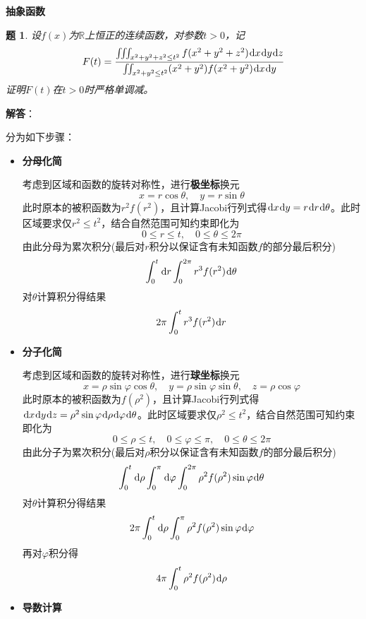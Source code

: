 \documentclass[a4paper,UTF8,fontset=windows,AutoFakeBold]{ctexart}
\newcommand*{\dr}{\hspace{0.07em}\mathrm{d}}
\newcommand*{\rb}{\mathbb{R}}
\theoremstyle{ex}
\newtheorem{exercise}{题}
\newcommand{\sol}[1]{{\vspace{5pt}\kaishu\noindent\textbf{解答}：\vspace{-3pt}
\begin{compactitem}
    \item[] #1
\end{compactitem}
}}
\begin{document}
\noindent\textbf{抽象函数}
\begin{framed}
\begin{exercise}
    设$f(x)$为$\rb$上恒正的连续函数，对参数$t>0$，记
    $$F(t)=\frac{\iiint_{x^2+y^2+z^2\le t^2}f(x^2+y^2+z^2)\dr x\dr y\dr z}{\iint_{x^2+y^2\le t^2}(x^2+y^2)f(x^2+y^2)\dr x\dr y}$$
    证明$F(t)$在$t>0$时严格单调减。
\end{exercise}
\sol{
    分为如下步骤：
    \begin{itemize}
        \item \textbf{分母化简}
        
        考虑到区域和函数的旋转对称性，进行\textbf{极坐标}换元
        $$x=r\cos\theta,\quad y=r\sin\theta$$
        此时原本的被积函数为$r^2f(r^2)$，且计算Jacobi行列式得$\dr x\dr y=r\dr r\dr\theta$。此时区域要求仅$r^2\le t^2$，结合自然范围可知约束即化为
        $$0\le r\le t,\quad0\le\theta\le2\pi$$
        由此分母为累次积分(最后对$r$积分以保证含有未知函数$f$的部分最后积分)
        $$\int_0^t\dr r\int_0^{2\pi}r^3f(r^2)\dr\theta$$
        对$\theta$计算积分得结果
        $$2\pi\int_0^tr^3f(r^2)\dr r$$

        \item \textbf{分子化简}
        
        考虑到区域和函数的旋转对称性，进行\textbf{球坐标}换元
        $$x=\rho\sin\varphi\cos\theta,\quad y=\rho\sin\varphi\sin\theta,\quad z=\rho\cos\varphi$$
        此时原本的被积函数为$f(\rho^2)$，且计算Jacobi行列式得$\dr x\dr y\dr z=\rho^2\sin\varphi\dr\rho\dr\varphi\dr\theta$。此时区域要求仅$\rho^2\le t^2$，结合自然范围可知约束即化为
        $$0\le\rho\le t,\quad0\le\varphi\le\pi,\quad0\le\theta\le2\pi$$
        由此分子为累次积分(最后对$\rho$积分以保证含有未知函数$f$的部分最后积分)
        $$\int_0^t\dr\rho\int_0^\pi\dr\varphi\int_0^{2\pi}\rho^2f(\rho^2)\sin\varphi\dr\theta$$
        对$\theta$计算积分得结果
        $$2\pi\int_0^t\dr\rho\int_0^\pi\rho^2f(\rho^2)\sin\varphi\dr\varphi$$
        再对$\varphi$积分得
        $$4\pi\int_0^t\rho^2f(\rho^2)\dr\rho$$
        
        \item \textbf{导数计算}
        

\end{itemize}}
\end{framed}
\end{document}

